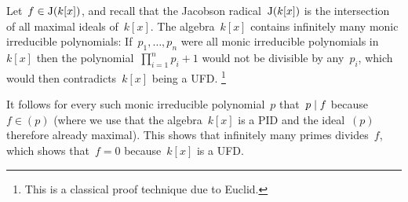\section{}


Let~$f \in \operatorname{J}(k[x])$, and recall that the Jacobson radical~$\operatorname{J}(k[x])$ is the intersection of all maximal ideals of~$k[x]$.
The algebra~$k[x]$ contains infinitely many monic irreducible polynomials:
If~$p_1, \dotsc, p_n$ were all monic irreducible polynomials in~$k[x]$ then the polynomial~$\prod_{i=1}^n p_i + 1$ would not be divisible by any~$p_i$, which would then contradicts~$k[x]$ being a UFD.%
\footnote{This is a classical proof technique due to Euclid.}

It follows for every such monic irreducible polynomial~$p$ that~$p \mid f$ because~$f \in (p)$ (where we use that the algebra~$k[x]$ is a PID and the ideal~$(p)$ therefore already maximal).
This shows that infinitely many  primes divides~$f$, which shows that~$f = 0$ because~$k[x]$ is a UFD.




